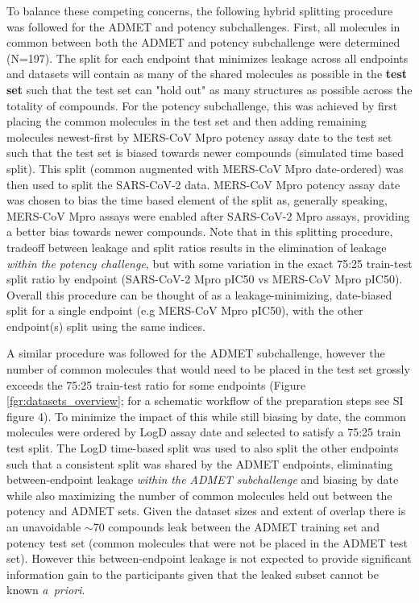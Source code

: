 \documentclass[journal=jcim,manuscript=article]{achemso}
\begin{document}
To balance these competing concerns, the following hybrid splitting procedure was followed for the ADMET and potency subchallenges. First, all molecules in common between both the ADMET and potency subchallenge were determined (N=197). The split for each endpoint that minimizes leakage across all endpoints and datasets will contain as many of the shared molecules as possible in the \textbf{test set} such that the test set can "hold out" as many structures as possible across the totality of compounds. For the potency subchallenge, this was achieved by first placing the common molecules in the test set and then adding remaining molecules newest-first by MERS-CoV Mpro potency assay date to the test set such that the test set is biased towards newer compounds (simulated time based split). This split (common augmented with MERS-CoV Mpro date-ordered) was then used to split the SARS-CoV-2 data. MERS-CoV Mpro potency assay date was chosen to bias the time based element of the split as, generally speaking, MERS-CoV Mpro assays were enabled after SARS-CoV-2 Mpro assays, providing a better bias towards newer compounds. Note that in this splitting procedure, tradeoff between leakage and split ratios results in the elimination of leakage \textit{within the potency challenge}, but with some variation in the exact 75:25 train-test split ratio by endpoint (SARS-CoV-2 Mpro pIC50 vs MERS-CoV Mpro pIC50). Overall this procedure can be thought of as a leakage-minimizing, date-biased split for a single endpoint (e.g MERS-CoV Mpro pIC50), with the other endpoint(s) split using the same indices.

A similar procedure was followed for the ADMET subchallenge, however the number of common molecules that would need to be placed in the test set grossly exceeds the 75:25 train-test ratio for some endpoints (Figure \ref{fgr:datasets_overview}; for a schematic workflow of the preparation steps see SI figure 4). To minimize the impact of this while still biasing by date, the common molecules were ordered by LogD assay date and selected to satisfy a 75:25 train test split. The LogD time-based split was used to also split the other endpoints such that a consistent split was shared by the ADMET endpoints, eliminating between-endpoint leakage \textit{within the ADMET subchallenge} and biasing by date while also maximizing the number of common molecules held out between the potency and ADMET sets. Given the dataset sizes and extent of overlap there is an unavoidable $\sim$70 compounds leak between the ADMET training set and potency test set (common molecules that were not be placed in the ADMET test set). However this between-endpoint leakage is not expected to provide significant information gain to the participants given that the leaked subset cannot be known \textit{a~priori}.
\end{document}
